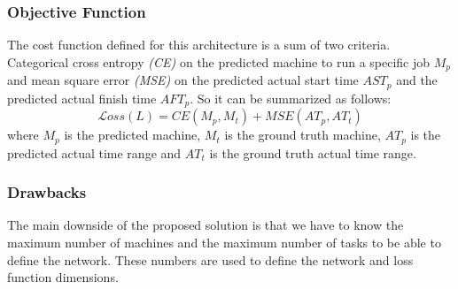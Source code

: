 \subsubsection{Objective Function}
The cost function defined for this architecture is a sum of two criteria. Categorical cross entropy \emph{(CE)} on the predicted machine to run a specific job $M_p$ and mean square error \emph{(MSE)} on the predicted actual start time $AST_p$ and the predicted actual finish time $AFT_p$. So it can be summarized as follows:
\begin{equation}
\mathcal Loss(L) = CE(M_p, M_t) + MSE(AT_p, AT_t) \label{eq:l}
\end{equation}
where $M_p$ is the predicted machine, $M_t$ is the ground truth machine, $AT_p$ is the predicted actual time range and $AT_t$ is the ground truth actual time range. \\

\subsubsection{Drawbacks}
The main downside of the proposed solution is that we have to know the maximum number of machines and the maximum number of tasks to be able to define the network. These numbers are used to define the network and loss function dimensions. 